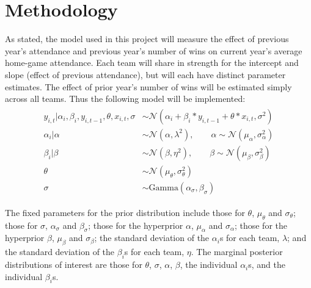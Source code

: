 \documentclass[11pt]{article}
\begin{document}
\vspace*{-.5\baselineskip}
\section{Methodology}


As stated, the model used in this project will measure the effect of previous year's attendance and previous year's number of wins on current year's average home-game attendance. Each team will share in strength for the intercept and slope (effect of previous attendance), but will each have distinct parameter estimates. The effect of prior year's number of wins will be estimated simply across all teams. Thus the following model will be implemented:
\begin{align}\label{eq:model}
\begin{split}
y_{i,t}|\alpha_i,\beta_i,y_{i,t-1},\theta,x_{i,t},\sigma&\sim\mathcal{N}\left(\alpha_i+{\beta_i} * y_{i,t-1} +\theta * x_{i,t},\sigma^2\right) \\
\alpha_i|\alpha&\sim\mathcal{N}(\alpha,\lambda^2),\qquad\alpha\sim \mathcal{N}(\mu_\alpha, \sigma_\alpha^2) \\
\beta_i|\beta&\sim\mathcal{N}(\beta,\eta^2),\qquad\beta\sim \mathcal{N}(\mu_\beta,\sigma_\beta^2) \\
\theta&\sim\mathcal{N}(\mu_\theta,\sigma_\theta^2)\\
\sigma&\sim\text{Gamma}(\alpha_\sigma, \beta_\sigma)
\end{split}
\end{align}

The fixed parameters for the prior distribution include those for $\theta$, $\mu_\theta$ and $\sigma_\theta$; those for $\sigma$, $\alpha_\sigma$ and $\beta_\sigma$; those for the hyperprior $\alpha$, $\mu_\alpha$ and $\sigma_\alpha$; those for the hyperprior $\beta$, $\mu_\beta$ and  $\sigma_\beta$; the standard deviation of the $\alpha_i$s for each team, $\lambda$; and the standard deviation of the $\beta_i$s for each team, $\eta$. The marginal posterior distributions of interest are those for $\theta$, $\sigma$, $\alpha$, $\beta$, the individual $\alpha_i$s, and the individual $\beta_i$s.

\end{document}

